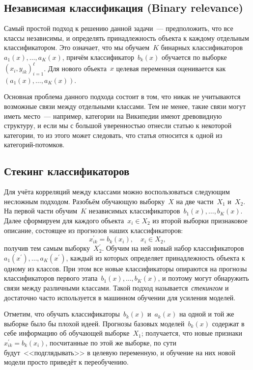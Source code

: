 \documentclass[12pt,fleqn]{article}
\begin{document}
\subsection{Независимая классификация (Binary relevance)}

Самый простой подход к решению данной задачи~--- предположить, что все классы независимы,
и определять принадлежность объекта к каждому отдельным классификатором.
Это означает, что мы обучаем~$K$ бинарных классификаторов~$a_1(x), \dots, a_K(x)$,
причём классификатор~$b_k(x)$ обучается по выборке~$(x_i, y_{ik})_{i = 1}^{\ell}$.
Для нового объекта~$x$ целевая переменная оценивается как~$(a_1(x), \dots, a_K(x))$.

Основная проблема данного подхода состоит в том, что никак не учитываются возможные
связи между отдельными классами.
Тем не менее, такие связи могут иметь место~--- например, категории на Википедии имеют древовидную структуру,
и если мы с большой уверенностью отнесли статью к некоторой категории, то из этого может следовать,
что статья относится к одной из категорий-потомков.

\subsection{Стекинг классификаторов}

Для учёта корреляций между классами можно воспользоваться следующим несложным подходом.
Разобьём обучающую выборку~$X$ на две части~$X_1$ и~$X_2$.
На первой части обучим~$K$ независимых классификаторов~$b_1(x), \dots, b_K(x)$.
Далее сформируем для каждого объекта~$x_i \in X_2$ из второй выборки признаковое описание,
состоящее из прогнозов наших классификаторов:
\[
    x_{ik}^\prime
    =
    b_k(x_i),
    \quad
    x_i \in X_2,
\]
получив тем самым выборку~$X_2^\prime$.
Обучим на ней новый набор классификаторов~$a_1(x^\prime), \dots, a_K(x^\prime)$,
каждый из которых определяет принадлежность объекта к одному из классов.
При этом все новые классификаторы опираются на прогнозы классификаторов
первого этапа~$b_1(x), \dots, b_K(x)$,
и поэтому могут обнаружить связи между различными классами.
Такой подход называется~\emph{стекингом}
и достаточно часто используется в машинном обучении для усиления моделей.

Отметим, что обучать классификаторы~$b_k(x)$ и~$a_k(x)$ на одной и той же выборке было бы плохой идеей.
Прогнозы базовых моделей~$b_k(x)$ содержат в себе информацию об обучающей выборке~$X_1$;
получается, что новые признаки~$x_{ik}^\prime = b_k(x_i)$, посчитанные по этой же выборке, по сути будут~<<подглядывать>>
в целевую переменную, и обучение на них новой модели просто приведёт к переобучению.
\end{document}
